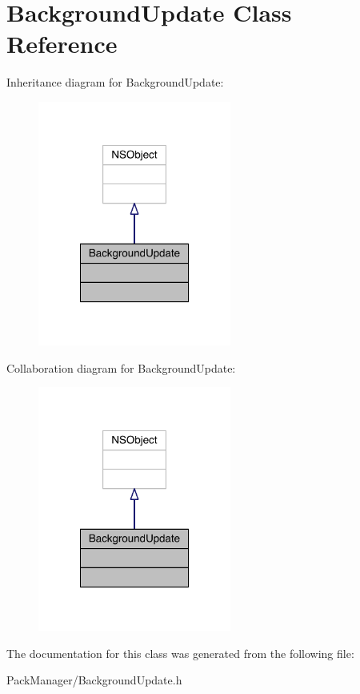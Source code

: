 \hypertarget{interface_background_update}{\section{Background\-Update Class Reference}
\label{interface_background_update}
}


Inheritance diagram for Background\-Update\-:\nopagebreak
\begin{figure}[H]
\begin{center}
\leavevmode
\includegraphics[width=180pt]{interface_background_update__inherit__graph}
\end{center}
\end{figure}


Collaboration diagram for Background\-Update\-:\nopagebreak
\begin{figure}[H]
\begin{center}
\leavevmode
\includegraphics[width=180pt]{interface_background_update__coll__graph}
\end{center}
\end{figure}


The documentation for this class was generated from the following file\-:\begin{DoxyCompactItemize}
\item 
Pack\-Manager/Background\-Update.\-h\end{DoxyCompactItemize}
